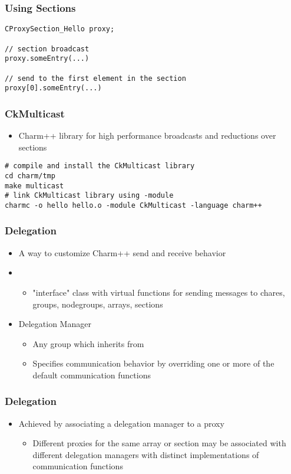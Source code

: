 \begin{frame}[fragile]
\frametitle{Using Sections}
\begin{lstlisting}
CProxySection_Hello proxy;

// section broadcast
proxy.someEntry(...) 

// send to the first element in the section
proxy[0].someEntry(...) 
\end{lstlisting}
\end{frame}

\begin{frame}[fragile]
\frametitle{CkMulticast}
\begin{itemize}
\item Charm++ library for high performance broadcasts and reductions over
  sections
\end{itemize}
\begin{lstlisting}
# compile and install the CkMulticast library
cd charm/tmp
make multicast
# link CkMulticast library using -module
charmc -o hello hello.o -module CkMulticast -language charm++
\end{lstlisting}
\end{frame}

\begin{frame}[fragile]
\frametitle{Delegation}
\begin{itemize}
\item A way to customize Charm++ send and receive behavior
\item {}
  \begin{itemize}
  \item "interface" class with virtual functions for sending messages to
    chares, groups, nodegroups, arrays, sections
  \end{itemize}
\item Delegation Manager
  \begin{itemize}
  \item Any group which inherits from 
  \item Specifies communication behavior by overriding one or more of the
    default communication functions
  \end{itemize}
\end{itemize}
\end{frame}

\begin{frame}[fragile]
\frametitle{Delegation}
\begin{itemize}
\item Achieved by associating a delegation manager to a proxy
  \begin{itemize}
  \item Different proxies for the same array or section may be associated with
    different delegation managers with distinct implementations of
    communication functions
  \end{itemize}
\end{itemize}
\end{frame}

